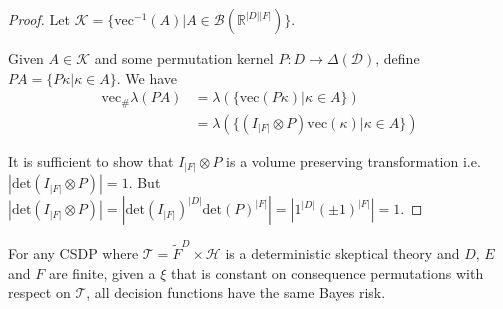 \begin{proof}
Let $\mathcal{K}=\{\mathrm{vec}^{-1}(A)|A\in\mathcal{B}(\mathbb{R}^{|D||F|})\}$.

Given $A\in \mathcal{K}$ and some permutation kernel $P:D\to \Delta(\mathcal{D})$, define $PA = \{P\kappa| \kappa\in A\}$. We have 
\begin{align}
    \mathrm{vec}_{\#}\lambda(PA) &= \lambda(\{\mathrm{vec}(P\kappa)|\kappa\in A\})\\
                              &= \lambda(\{(I_{|F|}\otimes P)\mathrm{vec}(\kappa)|\kappa\in A\})
\end{align}

It is sufficient to show that $I_{|F|}\otimes P$ is a volume preserving transformation i.e. $|\mathrm{det}(I_{|F|}\otimes P)|=1$. But $|\mathrm{det}(I_{|F|}\otimes P)| = |\mathrm{det}(I_{|F|})^{|D|}\mathrm{det}(P)^{|F|}|=|1^{|D|}(\pm 1)^{|F|}|=1$.
\end{proof}

\begin{theorem}\label{th:nfl_de_ba}
For any CSDP where $\mathscr{T}=\tilde{F}^D\times \mathscr{H}$ is a deterministic skeptical theory and $D$, $E$ and $F$ are finite, given a $\xi$ that is constant on consequence permutations with respect on $\mathscr{T}$, all decision functions have the same Bayes risk.
\end{theorem}

